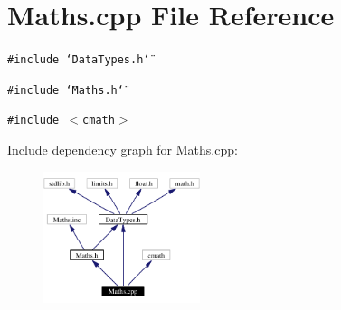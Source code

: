 \section{Maths.cpp File Reference}
\label{Maths_8cpp}
{\tt \#include \char`\"{}Data\-Types.h\char`\"{}}\par
{\tt \#include \char`\"{}Maths.h\char`\"{}}\par
{\tt \#include $<$cmath$>$}\par


Include dependency graph for Maths.cpp:\begin{figure}[H]
\begin{center}
\leavevmode
\includegraphics[width=130pt]{Maths_8cpp__incl}
\end{center}
\end{figure}
